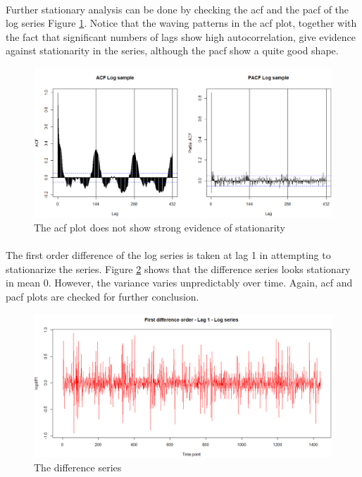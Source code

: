 \documentclass[12pt]{article}
\begin{document}
\paragraph{}
Further stationary analysis can be done by checking the acf and the pacf of the log series Figure \ref{fig:figure5}. Notice that the waving patterns in the acf plot, together with the fact that significant numbers of lags show high autocorrelation, give evidence against stationarity in the series, although the pacf show a quite good shape. 
\begin{figure}[H]
  \includegraphics[width=\linewidth]{figure5.png}
  \caption{The acf plot does not show strong evidence of stationarity}
  \label{fig:figure5}
\end{figure}

\paragraph{}
The first order difference of the log series is taken at lag 1 in attempting to stationarize the series. Figure \ref{fig:figure6}  shows that the difference series looks stationary in mean 0. However, the variance varies unpredictably over time. Again, acf and pacf plots are checked for further conclusion.
\begin{figure}[H]
  \includegraphics[width=\linewidth]{figure6.png}
  \caption{The difference series}
  \label{fig:figure6}
\end{figure}
\end{document}
